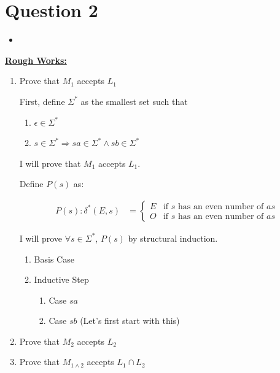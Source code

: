 \documentclass[12pt]{article}
\begin{document}
\bigskip

\section*{Question 2}

\bigskip

\begin{itemize}
    \item

\end{itemize}

\bigskip

\underline{\textbf{Rough Works:}}

\bigskip

\begin{enumerate}[1.]
    \item Prove that $M_1$ accepts $L_1$

    \begin{mdframed}
    First, define $\Sigma^*$ as the smallest set such that
    \begin{enumerate}
        \item $\epsilon \in \Sigma^*$
        \item $s \in \Sigma^* \Rightarrow sa \in \Sigma^* \land sb \in \Sigma^*$
    \end{enumerate}

    \bigskip

    I will prove that $M_1$ accepts $L_1$.

    \bigskip

    Define $P(s)$ as:

    \begin{align}
        P(s):\delta^*(E,s) &= \begin{cases}
            E & \text{if $s$ has an even number of $as$}\\
            O & \text{if $s$ has an even number of $as$}
        \end{cases}
    \end{align}

    I will prove $\forall s \in \Sigma^*$, $P(s)$ by structural induction.

    \begin{enumerate}[1.]
        \item Basis Case
        \item Inductive Step
        \begin{enumerate}[1.]
            \item Case $sa$
            \item Case $sb$ (Let's first start with this)
        \end{enumerate}
    \end{enumerate}
    \end{mdframed}

    \item Prove that $M_2$ accepts $L_2$
    \item Prove that $M_{1\land2}$ accepts $L_1 \cap L_2$
    \end{enumerate}
\end{document}
